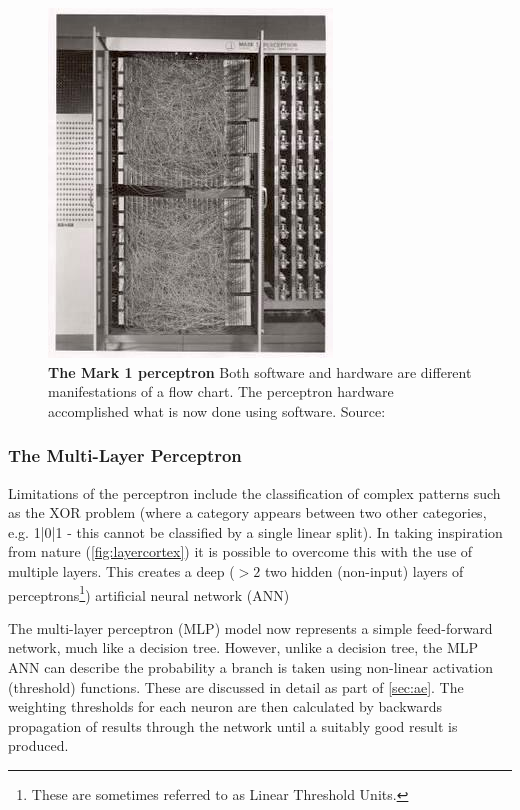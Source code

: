 \begin{figure}[H]
     \centering
         \includegraphics[width=.45\textwidth]{figures_c3/mlpregressor/Mark_I_perceptron.jpg}
        \caption{\textbf{The Mark 1 perceptron} Both software and hardware are different manifestations of a flow chart. The perceptron hardware accomplished what is now done using software. Source: \cite{perceptronimage}}
        \label{fig:perceptron}
\end{figure}

\subsubsection{The Multi-Layer Perceptron}\label{sec:perceptron}
Limitations of the perceptron include the classification of complex patterns such as the XOR problem (where a category appears between two other categories, e.g. {1|0|1} - this cannot be classified by a single linear split). In taking inspiration from nature (\autoref{fig:layercortex}) it is possible to overcome this with the use of multiple layers. This creates a deep ($>2$ two hidden (non-input) layers of perceptrons\footnote{These are sometimes referred to as Linear Threshold Units.}) artificial neural network (ANN) 

The multi-layer perceptron (MLP) model now represents a simple feed-forward network, much like a decision tree. However, unlike a decision tree, the MLP ANN can describe the probability a branch is taken using non-linear activation (threshold) functions. These are discussed in detail as part of \autoref{sec:ae}. The weighting thresholds for each neuron are then calculated by backwards propagation of results through the network until a suitably good result is produced. 

